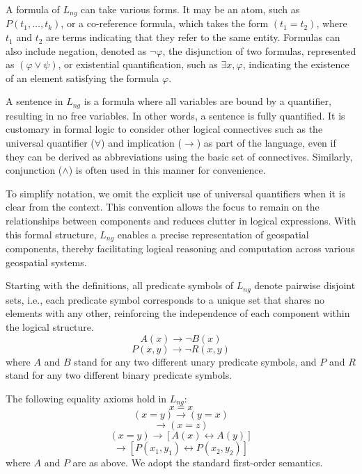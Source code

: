 A formula of $L_{ng}$ can take various forms. It may be an atom, such as $P(t_1, \dots, t_k)$, or a co-reference formula, which takes the form $(t_1 = t_2)$, where $t_1$ and $t_2$ are terms indicating that they refer to the same entity. Formulas can also include negation, denoted as $\neg \varphi$, the disjunction of two formulas, represented as $(\varphi \lor \psi)$, or existential quantification, such as $\exists x , \varphi$, indicating the existence of an element satisfying the formula $\varphi$.

A sentence in $L_{ng}$ is a formula where all variables are bound by a quantifier, resulting in no free variables. In other words, a sentence is fully quantified. It is customary in formal logic to consider other logical connectives such as the universal quantifier ($\forall$) and implication ($\rightarrow$) as part of the language, even if they can be derived as abbreviations using the basic set of connectives. Similarly, conjunction ($\land$) is often used in this manner for convenience.

To simplify notation, we omit the explicit use of universal quantifiers when it is clear from the context. This convention allows the focus to remain on the relationships between components and reduces clutter in logical expressions. With this formal structure, $L_{ng}$ enables a precise representation of geospatial components, thereby facilitating logical reasoning and computation across various geospatial systems.

Starting with the definitions, all predicate symbols of $L_{ng}$ denote pairwise disjoint sets, i.e., each predicate symbol corresponds to a unique set that shares no elements with any other, reinforcing the independence of each component within the logical structure.
\begin{equation}
A(x) \rightarrow \neg B(x)
\end{equation}
\begin{equation}
P(x, y) \rightarrow \neg R(x, y)
\end{equation}
where $A$ and $B$ stand for any two different unary predicate symbols, and $P$ and $R$ stand for any two different binary predicate symbols.

The following equality axioms hold in $L_{ng}$:
\begin{equation}
x = x
\end{equation}
\begin{equation}
(x = y) \rightarrow (y = x)
\end{equation}
\begin{equation}
[(x = y) \land (y = z)] \rightarrow (x = z)
\end{equation}
\begin{equation}
(x = y) \rightarrow [A(x) \leftrightarrow A(y)]
\end{equation}
\begin{equation}
[(x_1 = y_1) \land (x_2 = y_2)] \rightarrow [P(x_1, y_1) \leftrightarrow P(x_2, y_2)]
\end{equation}
where $A$ and $P$ are as above. We adopt the standard first-order semantics.

